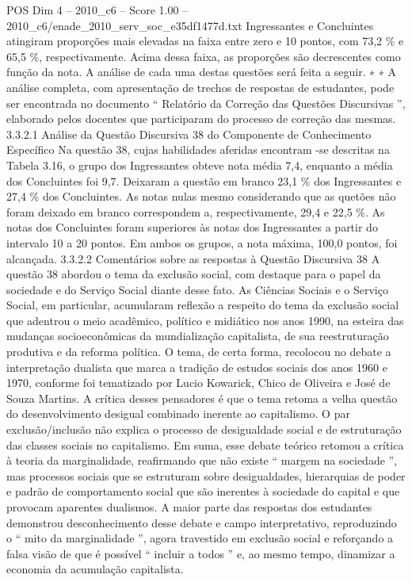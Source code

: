 \begin{textsample}{POS Dim 4 – 2010\_c6 – Score 1.00 – 2010\_c6/enade\_2010\_serv\_soc\_e35df1477d.txt}
Ingressantes e Concluintes atingiram proporções mais elevadas na faixa entre zero e 10 pontos, com 73,2 \% e 65,5 \%, respectivamente.
Acima dessa faixa, as proporções são decrescentes como função da nota.
A análise de cada uma destas questões será feita a seguir. ∗ ∗ A análise completa, com apresentação de trechos de respostas de estudantes, pode ser encontrada no documento “ Relatório da Correção das Questões Discursivas ”, elaborado pelos docentes que participaram do processo de correção das mesmas. 3.3.2.1 Análise da Questão Discursiva 38 do Componente de Conhecimento Específico Na questão 38, cujas habilidades aferidas encontram -se descritas na Tabela 3.16, o grupo dos Ingressantes obteve nota média 7,4, enquanto a média dos Concluintes foi 9,7.
Deixaram a questão em branco 23,1 \% dos Ingressantes e 27,4 \% dos Concluintes.
As notas nulas mesmo considerando que as quetões não foram deixado em branco correspondem a, respectivamente, 29,4 e 22,5 \%.
As notas dos Concluintes foram superiores às notas dos Ingressantes a partir do intervalo 10 a 20 pontos.
Em ambos os grupos, a nota máxima, 100,0 pontos, foi alcançada. 3.3.2.2 Comentários sobre as respostas à Questão Discursiva 38 A questão 38 abordou o tema da exclusão social, com destaque para o papel da sociedade e do Serviço Social diante desse fato.
As Ciências Sociais e o Serviço Social, em particular, acumularam reflexão a respeito do tema da exclusão social que adentrou o meio acadêmico, político e midiático nos anos 1990, na esteira das mudanças socioeconômicas da mundialização capitalista, de sua reestruturação produtiva e da reforma política.
O tema, de certa forma, recolocou no debate a interpretação dualista que marca a tradição de estudos sociais dos anos 1960 e 1970, conforme foi tematizado por Lucio Kowarick, Chico de Oliveira e José de Souza Martins.
A crítica desses pensadores é que o tema retoma a velha questão do desenvolvimento desigual combinado inerente ao capitalismo.
O par exclusão/inclusão não explica o processo de desigualdade social e de estruturação das classes sociais no capitalismo.
Em suma, esse debate teórico retomou a crítica à teoria da marginalidade, reafirmando que não existe “ margem na sociedade ”, mas processos sociais que se estruturam sobre desigualdades, hierarquias de poder e padrão de comportamento social que são inerentes à sociedade do capital e que provocam aparentes dualismos.
A maior parte das respostas dos estudantes demonstrou desconhecimento desse debate e campo interpretativo, reproduzindo o “ mito da marginalidade ”, agora travestido em exclusão social e reforçando a falsa visão de que é possível “ incluir a todos ” e, ao mesmo tempo, dinamizar a economia da acumulação capitalista.

\end{textsample}
